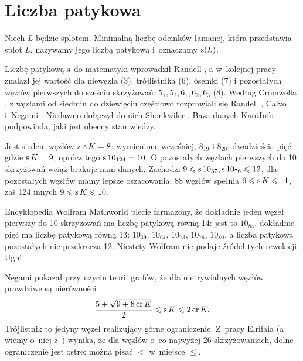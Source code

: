 
\section{Liczba patykowa}
%


\begin{definition}
    Niech $L$ będzie splotem.
    Minimalną liczbę odcinków łamanej, która przedstawia splot $L$, nazywamy jego liczbą patykową i~oznaczamy $\operatorname{s}(L)$.
\end{definition}

Liczbę patykową $\operatorname{s}$ do matematyki wprowadził Randell \cite{randell1994}, a w~kolejnej pracy \cite{randell1998} znalazł jej wartość dla niewęzła (3), trójlistnika (6), ósemki (7) i pozostałych węzłów pierwszych do sześciu skrzyżowań: $5_1, 5_2, 6_1, 6_2, 6_3$ (8).
%
Według Cromwella \cite{cromwell2004}, z węzłami od siedmiu do dziewięciu częściowo rozprawiali się Randell \cite{randell1994}, Calvo \cite{calvo1998} i~Negami \cite{negami1991}.
%
%
%
Niedawno dołączył do nich Shonkwiler \cite{shonkwiler2022}.
%
Baza danych KnotInfo podpowiada, jaki jest obecny stan wiedzy.

Jest siedem węzłów z $\operatorname{s} K = 8$: wymienione wcześniej, $8_{19}$ i $8_{20}$;
dwadzieścia pięć gdzie $\operatorname{s} K = 9$; oprócz tego $\operatorname{s} 10_{124} = 10$.
O pozostałych węzłach pierwszych do 10 skrzyżowań wciąż brakuje nam danych.
Zachodzi $9 \leqslant \operatorname{s} 10_{37}, \operatorname{s} 10_{76} \leqslant 12$, dla pozostałych węzłów mamy lepsze oszacowania.
88 węzłów spełnia $9 \leqslant \operatorname{s} K \leqslant 11$, zaś 124 innych $9 \leqslant \operatorname{s} K \leqslant 10$.

Encyklopedia Wolfram Mathworld plecie farmazony, że dokładnie jeden węzeł pierwszy do 10 skrzyżowań ma liczbę patykową równą 14: jest to $10_{84}$, dokładnie pięć ma liczbę patykową równą 13: $10_{39}$, $10_{64}$, $10_{73}$, $10_{76}$, $10_{80}$, a liczba patykowa pozostałych nie przekracza 12.
Niestety Wolfram nie podaje źródeł tych rewelacji.
Ugh!

Negami \cite{negami1991} pokazał przy użyciu teorii grafów, że dla nietrywialnych węzłów prawdziwe są nierówności
%
\begin{equation}
    \frac{5+\sqrt{9 + 8 \operatorname{cr} K}}{2} \leqslant \operatorname{s} K \leqslant 2 \operatorname{cr} K.
\end{equation}
Trójlistnik to jedyny węzeł realizujący górne ograniczenie.
Z~pracy Elrifaia \cite{elrifai2006} (a wiemy o~niej z~\cite{huh2011}) wynika, że dla węzłów o~co najwyżej 26 skrzyżowaniach, dolne ograniczenie jest ostre: można pisać $<$ w~miejsce $\le$.
%


